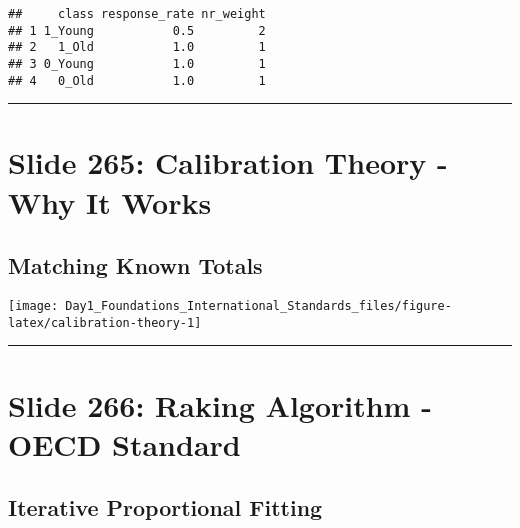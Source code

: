 \documentclass[
]{article}
\begin{document}
\begin{verbatim}
##     class response_rate nr_weight
## 1 1_Young           0.5         2
## 2   1_Old           1.0         1
## 3 0_Young           1.0         1
## 4   0_Old           1.0         1
\end{verbatim}

\begin{center}\rule{0.5\linewidth}{0.5pt}\end{center}

\section{Slide 265: Calibration Theory - Why It
Works}\label{slide-265-calibration-theory---why-it-works}

\subsection{Matching Known Totals}\label{matching-known-totals}

\texttt{[image: Day1\_Foundations\_International\_Standards\_files/figure-latex/calibration-theory-1]}

\begin{center}\rule{0.5\linewidth}{0.5pt}\end{center}

\section{Slide 266: Raking Algorithm - OECD
Standard}\label{slide-266-raking-algorithm---oecd-standard}

\subsection{Iterative Proportional
Fitting}\label{iterative-proportional-fitting}
\end{document}

